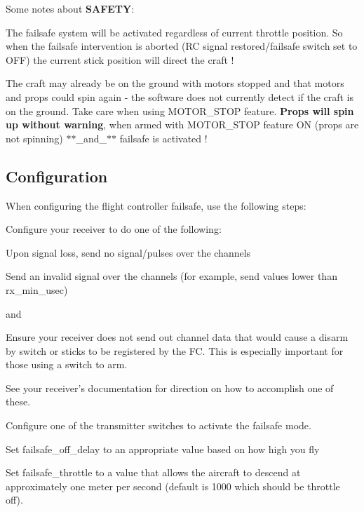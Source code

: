 Some notes about {\bfseries S\+A\+F\+E\+T\+Y}\+:
\begin{DoxyItemize}
\item The failsafe system will be activated regardless of current throttle position. So when the failsafe intervention is aborted (R\+C signal restored/failsafe switch set to O\+F\+F) the current stick position will direct the craft !
\item The craft may already be on the ground with motors stopped and that motors and props could spin again -\/ the software does not currently detect if the craft is on the ground. Take care when using {\ttfamily M\+O\+T\+O\+R\+\_\+\+S\+T\+O\+P} feature. {\bfseries Props will spin up without warning}, when armed with {\ttfamily M\+O\+T\+O\+R\+\_\+\+S\+T\+O\+P} feature O\+N (props are not spinning) $\ast$$\ast$\+\_\+and\+\_\+$\ast$$\ast$ failsafe is activated !
\end{DoxyItemize}

\subsection*{Configuration}

When configuring the flight controller failsafe, use the following steps\+:


\begin{DoxyEnumerate}
\item Configure your receiver to do one of the following\+:
\end{DoxyEnumerate}
\begin{DoxyItemize}
\item Upon signal loss, send no signal/pulses over the channels
\item Send an invalid signal over the channels (for example, send values lower than {\ttfamily rx\+\_\+min\+\_\+usec})
\end{DoxyItemize}

and


\begin{DoxyItemize}
\item Ensure your receiver does not send out channel data that would cause a disarm by switch or sticks to be registered by the F\+C. This is especially important for those using a switch to arm.
\end{DoxyItemize}

See your receiver's documentation for direction on how to accomplish one of these.


\begin{DoxyItemize}
\item Configure one of the transmitter switches to activate the failsafe mode.
\end{DoxyItemize}
\begin{DoxyEnumerate}
\item Set {\ttfamily failsafe\+\_\+off\+\_\+delay} to an appropriate value based on how high you fly
\item Set {\ttfamily failsafe\+\_\+throttle} to a value that allows the aircraft to descend at approximately one meter per second (default is 1000 which should be throttle off).
\end{DoxyEnumerate}

